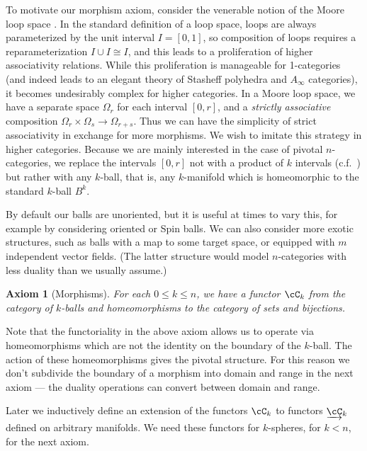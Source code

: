 \documentclass{pnastwo}
\newcommand{\cl}[1]{\underrightarrow{#1}}
\newtheorem{axiom}[prop]{Axiom}
\begin{document}
\begin{article}
To motivate our morphism axiom, consider the venerable notion of the Moore loop space
\cite[\S 2.2]{MR505692}.
In the standard definition of a loop space, loops are always parameterized by the unit interval $I = [0,1]$,
so composition of loops requires a reparameterization $I\cup I \cong I$, and this leads to a proliferation
of higher associativity relations.
While this proliferation is manageable for 1-categories (and indeed leads to an elegant theory
of Stasheff polyhedra and $A_\infty$ categories), it becomes undesirably complex for higher categories.
In a Moore loop space, we have a separate space $\Omega_r$ for each interval $[0,r]$, and a 
{\it strictly associative} composition $\Omega_r\times \Omega_s\to \Omega_{r+s}$.
Thus we can have the simplicity of strict associativity in exchange for more morphisms.
We wish to imitate this strategy in higher categories.
Because we are mainly interested in the case of pivotal $n$-categories, we replace the intervals $[0,r]$ not with
a product of $k$ intervals (c.f.\ \cite{0909.2212}) but rather with any $k$-ball, that is, 
any $k$-manifold which is homeomorphic
to the standard $k$-ball $B^k$.

By default our balls are unoriented,
but it is useful at times to vary this,
for example by considering oriented or Spin balls.
We can also consider more exotic structures, such as balls with a map to some target space,
or equipped with $m$ independent vector fields.
(The latter structure would model $n$-categories with less duality than we usually assume.)

\begin{axiom}[Morphisms]
\label{axiom:morphisms}
For each $0 \le k \le n$, we have a functor $\cC_k$ from 
the category of $k$-balls and 
homeomorphisms to the category of sets and bijections.
\end{axiom}

Note that the functoriality in the above axiom allows us to operate via
homeomorphisms which are not the identity on the boundary of the $k$-ball.
The action of these homeomorphisms gives the pivotal structure.
For this reason we don't subdivide the boundary of a morphism
into domain and range in the next axiom --- the duality operations can convert between domain and range.

Later we inductively define an extension of the functors $\cC_k$ to functors $\cl{\cC}_k$ 
defined on arbitrary manifolds. 
We need  these functors for $k$-spheres, for $k<n$, for the next axiom.


\end{article}
\end{document}
